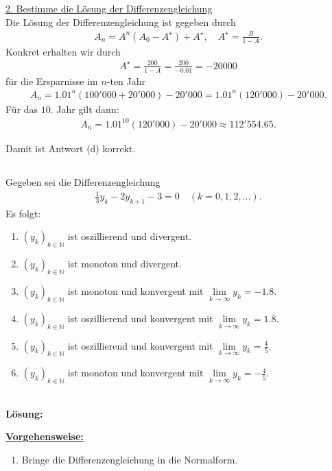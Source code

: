 \underline{2. Bestimme die Lösung der Differenzengleichung}\\
Die Lösung der Differenzengleichung ist gegeben durch
\begin{align*}
	A_n = A^n (A_0 - A^\star) + A^\star, \quad A^\star = \frac{B}{1-A}.
\end{align*}
Konkret erhalten wir durch
\begin{align*}
	A^\star = \frac{200}{1-A} = \frac{200}{-0.01} = -20000
\end{align*}
für die Ersparnisse im $n$-ten Jahr
\begin{align*}
	A_n = 1.01^n (100'000 + 20'000) - 20'000
	= 1.01^n (120'000 ) - 20'000.
\end{align*}
Für das $10$. Jahr gilt dann:
\begin{align*}
	A_n
	=
	1.01^{10} (120'000 ) - 20'000
	\approx
	112'554.65.
\end{align*}

Damit ist Antwort (d) korrekt.

\newpage

\subsection*{}
Gegeben sei die Differenzengleichung
\begin{align*}
	\frac{1}{3} y_k
	-
	2 y_{k+1}
	-3
	=0
	\quad (k = 0,1,2,...).
\end{align*}
Es folgt:
\renewcommand{\labelenumi}{(\alph{enumi})}
\begin{enumerate}
	\item
	$ (y_k)_{k \in \mathbb{N}} $ ist oszillierend und divergent.
	\item
	$ (y_k)_{k \in \mathbb{N}} $ ist monoton und divergent.	
	\item 
	$ (y_k)_{k \in \mathbb{N}} $ ist monoton und konvergent mit $ \lim \limits_{k \to \infty} y_k = -1.8$.
	\item
	$ (y_k)_{k \in \mathbb{N}} $ ist oszillierend und konvergent mit $ \lim \limits_{k \to \infty} y_k = 1.8$.
	\item 
	$ (y_k)_{k \in \mathbb{N}} $ ist oszillierend und konvergent mit $ \lim \limits_{k \to \infty} y_k = \frac{4}{5}$.
	\item 
	$ (y_k)_{k \in \mathbb{N}} $ ist monoton und konvergent mit $ \lim \limits_{k \to \infty} y_k = -\frac{4}{5}$.
\end{enumerate}
\ \\
\textbf{Lösung:}
\begin{mdframed}
\underline{\textbf{Vorgehensweise:}}
\renewcommand{\labelenumi}{\theenumi.}
\begin{enumerate}
\item Bringe die Differenzengleichung in die Normalform.
\end{enumerate}
\end{mdframed}

